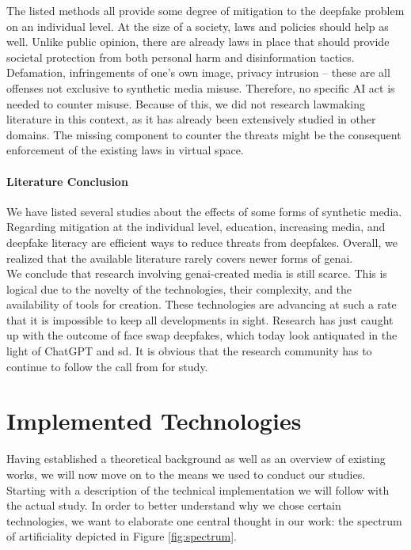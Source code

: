 \documentclass[
  a4paper,  %
  twoside,  %
  bibliography=totoc,
  headsepline,
  cleardoublepage=empty,
  parskip=half,
  draft=false
]{scrbook}
\begin{document}
The listed methods all provide some degree of mitigation to the deepfake problem on an individual level. At the size of a society, laws and policies should help as well. Unlike public opinion, there are already laws in place that should provide societal protection from both personal harm and disinformation tactics. Defamation, infringements of one's own image, privacy intrusion – these are all offenses not exclusive to synthetic media misuse. Therefore, no specific AI act is needed to counter misuse. Because of this, we did not research lawmaking literature in this context, as it has already been extensively studied in other domains. The missing component to counter the threats might be the consequent enforcement of the existing laws in virtual space. 

\subsubsection*{Literature Conclusion}
We have listed several studies about the effects of some forms of synthetic media. Regarding mitigation at the individual level, education, increasing media, and deepfake literacy are efficient ways to reduce threats from deepfakes. Overall, we realized that the available literature rarely covers newer forms of \gls{genai}. \\
We conclude that research involving \gls{genai}-created media is still scarce. This is logical due to the novelty of the technologies, their complexity, and the availability of tools for creation. These technologies are advancing at such a rate that it is impossible to keep all developments in sight. Research has just caught up with the outcome of face swap deepfakes, which today look antiquated in the light of ChatGPT and \gls{sd}. It is obvious that the research community has to continue to follow the call from \citet{hancockSocialImpactDeepfakes2021} for study.

\chapter{Implemented Technologies}
\label{chap:implementation}
Having established a theoretical background as well as an overview of existing works, we will now move on to the means we used to conduct our studies. Starting with a description of the technical implementation we will follow with the actual study. In order to better understand why we chose certain technologies, we want to elaborate one central thought in our work: the spectrum of artificiality depicted in Figure \ref{fig:spectrum}.
\end{document}
